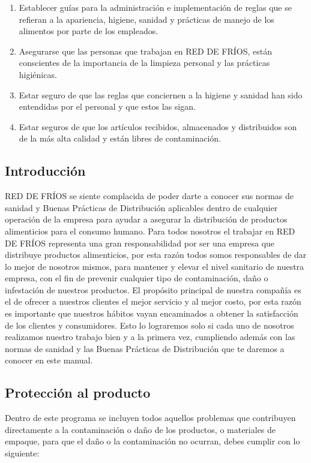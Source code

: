 \begin{enumerate}
	\item Establecer guías para la administración e implementación de reglas que se refieran a la apariencia, higiene, sanidad y prácticas de manejo de los alimentos por parte de los empleados.
	\item Asegurarse que las personas que trabajan en RED DE FRÍOS, están conscientes de la importancia de la limpieza personal y las prácticas higiénicas.
	\item Estar seguro de que las reglas que conciernen a la higiene y sanidad han sido entendidas por el personal y que estos las sigan.
	\item Estar seguros de que los artículos recibidos, almacenados y distribuidos son de la más alta calidad y están libres de contaminación.
\end{enumerate}

\subsection{Introducción}

RED DE FRÍOS se siente complacida de poder darte a conocer sus normas de sanidad y Buenas Prácticas de Distribución aplicables dentro de cualquier operación de la empresa para ayudar a asegurar la distribución de productos alimenticios para el consumo humano.
Para todos nosotros el trabajar en RED DE FRÍOS representa una gran responsabilidad por ser una empresa que distribuye productos alimenticios, por esta razón todos somos responsables de dar lo mejor de nosotros mismos, para mantener y elevar el nivel sanitario de nuestra empresa, con el fin de prevenir cualquier tipo de contaminación, daño o infestación de nuestros productos.
El propósito principal de nuestra compañía es el de ofrecer a nuestros clientes el mejor servicio y al mejor costo, por esta razón es importante que nuestros hábitos vayan encaminados a obtener la satisfacción de los clientes y consumidores.
Esto lo lograremos solo si cada uno de nosotros realizamos nuestro trabajo bien y a la primera vez, cumpliendo además con las normas de sanidad y las Buenas Prácticas de Distribución que te daremos a conocer en este manual.

\subsection{Protección al producto}

Dentro de este programa se incluyen todos aquellos problemas que contribuyen directamente a la contaminación o daño de los productos, o materiales de empaque, para que el daño o la contaminación no ocurran, debes cumplir con lo siguiente:

